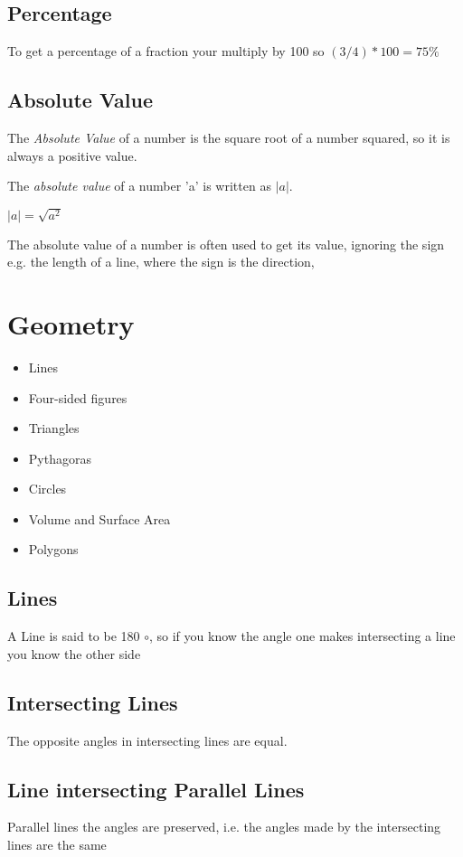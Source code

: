 \documentclass{article}
\begin{document}
\subsection{Percentage}
To get a percentage of a fraction your multiply by 100 so $ ( 3/4 ) * 100 = 75\%$

\subsection{Absolute Value}
The \textit{Absolute Value} of a number is the square root of a number squared, so it is always a positive value. 

The \textit{absolute value} of a number 'a' is written as $|a|$.

$ |a| = \sqrt{a^{2}}$ 

The absolute value of a number is often used to get its value, ignoring the sign e.g. the length of a line, where the sign is the direction,



\newpage
\section{Geometry}

\begin{itemize}
\item Lines
\item Four-sided figures
\item Triangles
\item Pythagoras
\item Circles
\item Volume and Surface Area
\item Polygons
\end{itemize}

\subsection{Lines}
A Line is said to be 180 $\circ$, so if you know the angle one makes intersecting a line you know the other side
\subsection{Intersecting Lines}
The opposite angles in intersecting lines are equal.
\subsection{Line intersecting Parallel Lines}
Parallel lines the angles are preserved, i.e. the angles made by the intersecting lines are the same
\end{document}
